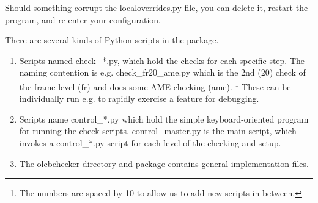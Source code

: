 Should something corrupt the localoverrides.py file,
you can delete it, restart the program, and re-enter your configuration.

There are several kinds of Python scripts in the package.
\begin{enumerate}
\item Scripts named check\_*.py, which hold the checks for each specific step.
    The naming contention is e.g. check\_fr20\_ame.py which is the 2nd (20)
    check of the frame level (fr) and does some AME checking (ame).
    \footnote{The numbers are spaced by 10 to allow us to add new scripts in between.}
    These can be individually run e.g. to rapidly exercise a feature for debugging.
\item Scripts name control\_*.py which hold the simple keyboard-oriented
    program for running the check scripts.  control\_master.py is the
    main script, which invokes a control\_*.py script for each level of the
    checking and setup.
\item The olcbchecker directory and package contains general implementation
    files.
\end{enumerate}





